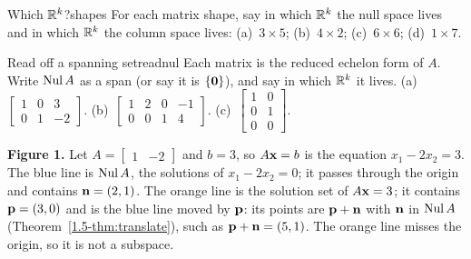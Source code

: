 \documentclass[11pt]{article}
\begin{document}
\begin{kc}{Which $\mathbb{R}^k$?}{shapes}
For each matrix shape, say in which $\mathbb{R}^k$ the null space lives and in which $\mathbb{R}^k$ the column space lives: (a)~$3\times5$; (b)~$4\times2$; (c)~$6\times6$; (d)~$1\times7$.
\end{kc}

\begin{kc}{Read off a spanning set}{readnul}
Each matrix is the reduced echelon form of $A$. Write $\operatorname{Nul} A$ as a span (or say it is $\{\mathbf{0}\}$), and say in which $\mathbb{R}^k$ it lives. (a)~$\begin{bmatrix}1&0&3\\0&1&-2\end{bmatrix}$. (b)~$\begin{bmatrix}1&2&0&-1\\0&0&1&4\end{bmatrix}$. (c)~$\begin{bmatrix}1&0\\0&1\\0&0\end{bmatrix}$.
\end{kc}

\begin{center}
\end{center}

\textbf{Figure 1.} Let $A=\begin{bmatrix}1&-2\end{bmatrix}$ and $b=3$, so $A\mathbf{x}=b$ is the equation $x_1-2x_2=3$. The blue line is $\operatorname{Nul} A$, the solutions of $x_1-2x_2=0$; it passes through the origin and contains $\mathbf{n}=(2,1)$. The orange line is the solution set of $A\mathbf{x}=3$; it contains $\mathbf{p}=(3,0)$ and is the blue line moved by $\mathbf{p}$: its points are $\mathbf{p}+\mathbf{n}$ with $\mathbf{n}$ in $\operatorname{Nul} A$ (Theorem~\ref{1.5-thm:translate}), such as $\mathbf{p}+\mathbf{n}=(5,1)$. The orange line misses the origin, so it is not a subspace.
\end{document}
